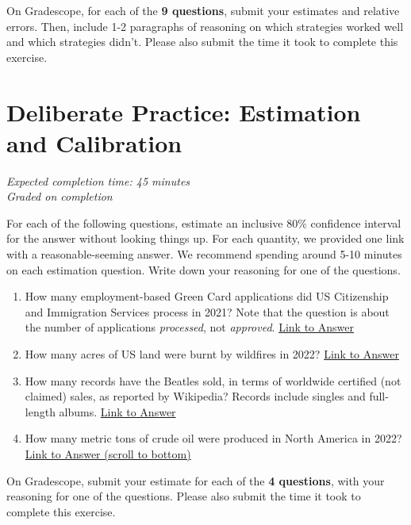 \documentclass[11pt]{article}
\begin{document}
On Gradescope, for each of the \textbf{9 questions}, submit your estimates and relative errors. Then, include 1-2 paragraphs of reasoning on which strategies worked well and which strategies didn't. Please also submit the time it took to complete this exercise.

\section*{Deliberate Practice: Estimation and Calibration}

\emph{Expected completion time: 45 minutes} \\
\emph{Graded on completion}

For each of the following questions, estimate an inclusive $80\%$ confidence interval for the answer without looking things up. For each quantity, we provided one link with a reasonable-seeming answer. We recommend spending around 5-10 minutes on each estimation question. Write down your reasoning for one of the questions. 

\begin{enumerate}
	\item How many employment-based Green Card applications did US Citizenship and Immigration Services process in 2021? Note that the question is about the number of applications \emph{processed}, not \emph{approved}. \href{https://www.uscis.gov/newsroom/news-releases/uscis-announces-fy-2021-accomplishments}{Link to Answer}
	\item How many acres of US land were burnt by wildfires in 2022? \href{https://sgp.fas.org/crs/misc/IF10244.pdf}{Link to Answer}
	\item How many records have the Beatles sold, in terms of worldwide certified (not claimed) sales, as reported by Wikipedia? Records include singles and full-length albums. \href{https://en.wikipedia.org/wiki/List_of_best-selling_music_artists#250_million_or_more_records}{Link to Answer}
	\item How many metric tons of crude oil were produced in North America in 2022? \\ \href{https://yearbook.enerdata.net/crude-oil/world-production-statistics.html}{Link to Answer (scroll to bottom)}
\end{enumerate}

On Gradescope, submit your estimate for each of the \textbf{4 questions}, with your reasoning for one of the questions. Please also submit the time it took to complete this exercise.
\end{document}
